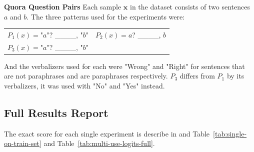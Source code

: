 \documentclass[11pt,a4paper]{article}
\begin{document}
\vspace{8pt}
\noindent \textbf{Quora Question Pairs} \quad
Each sample $\textbf{x}$ in the dataset consists of two sentences $a$ and $b$.
The three patterns used for the experiments were:
\begin{table}[H]
	\renewcommand{\arraystretch}{1.5}
	\begin{tabularx}{\textwidth}{cc}
		$P_1(x)=$"$a$"? \_\_\_\_, "$b$" & $P_2(x)=$$a$? \_\_\_\_, $b$ \\ 
		$P_3(x)=$"$a$"? \_\_\_\_, "$b$" & \\
	\end{tabularx}
\end{table}
And the verbalizers used for each were "Wrong" and "Right" for sentences that are not paraphrases and are paraphrases respectively.
$P_3$ differs from $P_1$ by its verbalizers, it was used with "No" and "Yes" instead.

\subsection{Full Results Report}
\label{apx:full-results-report}
The exact score for each single experiment is describe in and Table~\ref{tab:single-on-train-set} and Table~\ref{tab:multi-use-logits-full}.

%

\end{document}
